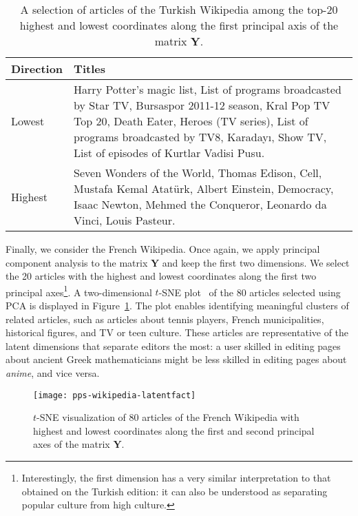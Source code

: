 \begin{table}
	\centering
	\caption{A selection of articles of the Turkish Wikipedia among the top-\num{20} highest and lowest coordinates along the first principal axis of the matrix $\bm{Y}$.}
	\label{pps:tab:wikitrlatent}
	\begin{tabular}{lp{4.8in}}
		\toprule
		Direction & Titles                       \\
		\midrule
		Lowest    &
		Harry Potter's magic list,
		List of programs broadcasted by Star TV,
		Bursaspor 2011-12 season,
		Kral Pop TV Top 20,
		Death Eater,
		Heroes (TV series),
		List of programs broadcasted by TV8,
		Karadayı,
		Show TV,
		List of episodes of Kurtlar Vadisi Pusu. \\
		Highest   &
		Seven Wonders of the World,
		Thomas Edison,
		Cell,
		Mustafa Kemal Atatürk,
		Albert Einstein,
		Democracy,
		Isaac Newton,
		Mehmed the Conqueror,
		Leonardo da Vinci,
		Louis Pasteur.                           \\
		\bottomrule
	\end{tabular}
\end{table}

Finally, we consider the French Wikipedia.
Once again, we apply principal component analysis to the matrix $\bm{Y}$ and keep the first two dimensions.
We select the \num{20} articles with the highest and lowest coordinates along the first two principal axes\footnote{%
	Interestingly, the first dimension has a very similar interpretation to that obtained on the Turkish edition: it can also be understood as separating popular culture from high culture.}.
A two-dimensional $t$-SNE plot~\citep{vandermaaten2008visualizing} of the 80 articles selected using PCA is displayed in Figure~\ref{pps:fig:wikifrlatent}.
The plot enables identifying meaningful clusters of related articles, such as articles about tennis players, French municipalities, historical figures, and TV or teen culture.
These articles are representative of the latent dimensions that separate editors the most:
a user skilled in editing pages about ancient Greek mathematicians might be less skilled in editing pages about \emph{anime}, and vice versa.

\begin{figure}
	\centering
	\texttt{[image: pps-wikipedia-latentfact]}
	\caption{$t$-SNE visualization of 80 articles of the French Wikipedia with highest and lowest coordinates along the first and second principal axes of the matrix $\bm{Y}$.}
	\label{pps:fig:wikifrlatent}
\end{figure}
